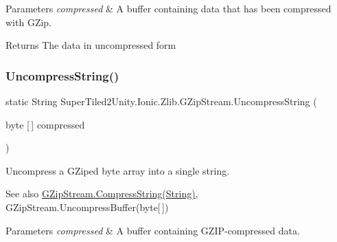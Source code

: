 \begin{DoxyParams}{Parameters}
{\em compressed} & A buffer containing data that has been compressed with G\+Zip. \\
\hline
\end{DoxyParams}


\begin{DoxyReturn}{Returns}
The data in uncompressed form
\end{DoxyReturn}
\mbox{\label{class_super_tiled2_unity_1_1_ionic_1_1_zlib_1_1_g_zip_stream_aa0f08dbda6cd5100d69af35ecbf7baf3}} 
\subsubsection{\texorpdfstring{Uncompress\+String()}{UncompressString()}}
{\footnotesize\ttfamily static String Super\+Tiled2\+Unity.\+Ionic.\+Zlib.\+G\+Zip\+Stream.\+Uncompress\+String (\begin{DoxyParamCaption}\item[{byte \mbox{[}$\,$\mbox{]}}]{compressed }\end{DoxyParamCaption})\hspace{0.3cm}{\ttfamily [static]}}



Uncompress a G\+Zip\textquotesingle{}ed byte array into a single string. 

\begin{DoxySeeAlso}{See also}
\mbox{\hyperlink{class_super_tiled2_unity_1_1_ionic_1_1_zlib_1_1_g_zip_stream_a9fc4f76be82e1858510a322bcbf33d19}{G\+Zip\+Stream.\+Compress\+String(\+String)}}, G\+Zip\+Stream.\+Uncompress\+Buffer(byte\mbox{[}$\,$\mbox{]})


\end{DoxySeeAlso}



\begin{DoxyParams}{Parameters}
{\em compressed} & A buffer containing G\+Z\+I\+P-\/compressed data. \\
\hline
\end{DoxyParams}


